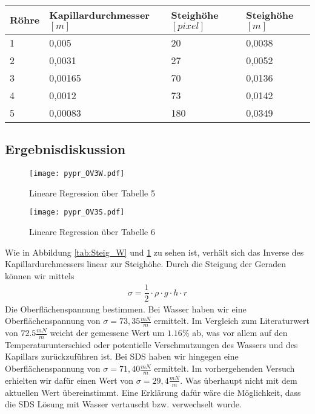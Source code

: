 \documentclass{scrartcl}
\begin{document}
\begin{table}[H]
\begin{center}
\begin{tabular}{l|l|l|l}
Röhre & Kapillardurchmesser $[m]$& Steighöhe $[pixel]$ & Steighöhe $[m]$       \\
\hline
1       & 0,005   	& 20 	& 0,0038 \\
2       & 0,0031   	& 27 	& 0,0052 \\
3       & 0,00165   & 70	& 0,0136 \\
4       & 0,0012   	& 73	& 0,0142 \\
5       & 0,00083	& 180	& 0,0349 \\
\end{tabular}
\end{center}
\label{tab:Steig_S}
\end{table}
\subsection{Ergebnisdiskussion}
\begin{figure}[H]
  \centering
    \texttt{[image: pypr\_OV3W.pdf]}
  \caption{Lineare Regression über Tabelle 5}
  \label{fig:Steig_W}
\end{figure}
\begin{figure}[H]
  \centering
    \texttt{[image: pypr\_OV3S.pdf]}
  \caption{Lineare Regression über Tabelle 6}
  \label{fig:Steig_S}
\end{figure}
Wie in Abbildung \ref{tab:Steig_W} und \ref{tab:Steig_S} zu sehen ist, verhält sich das Inverse des Kapillardurchmessers linear zur Steighöhe. Durch die Steigung der Geraden können wir mittels
\begin{align}
\sigma = \dfrac{1}{2}\cdot \rho \cdot g \cdot h \cdot r 
\label{eq:sigma_V3}
\end{align}
Die Oberflächenspannung bestimmen.
Bei Wasser haben wir eine Oberflächenspannung von $\sigma = 73,35 \frac{mN}{m}$ ermittelt. Im Vergleich zum Literaturwert von $72.5 \frac{mN}{m}$ weicht der gemessene Wert um $1.16\%$ ab, was vor allem auf den Temperaturunterschied oder potentielle Verschmutzungen des Wassers und des Kapillars zurückzuführen ist.
Bei SDS haben wir hingegen eine Oberflächenspannung von $\sigma = 71,40 \frac{mN}{m}$ ermittelt. Im vorhergehenden Versuch erhielten wir dafür einen Wert von $\sigma = 29,4 \frac{mN}{m}$. Was überhaupt nicht mit dem aktuellen Wert übereinstimmt.
Eine Erklärung dafür wäre die Möglichkeit, dass die SDS Lösung mit Wasser vertauscht bzw. verwechselt wurde.
\end{document}
